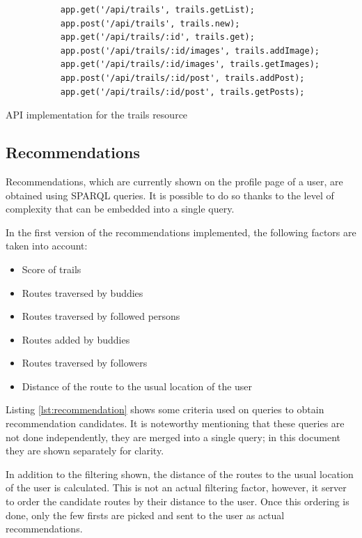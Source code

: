 \begin{listing}[ht]\centering
  \begin{minipage}{.7\textwidth}
    \begin{verbatim}
           app.get('/api/trails', trails.getList);
           app.post('/api/trails', trails.new);
           app.get('/api/trails/:id', trails.get);
           app.post('/api/trails/:id/images', trails.addImage);
           app.get('/api/trails/:id/images', trails.getImages);
           app.post('/api/trails/:id/post', trails.addPost);
           app.get('/api/trails/:id/post', trails.getPosts);
    \end{verbatim}
  \end{minipage}
  \caption{API implementation for the trails resource}\label{lst:routes}
\end{listing}

\subsection{Recommendations}

Recommendations, which are currently shown on the profile page of a user, are obtained using SPARQL queries. It is possible to do so thanks to the level of complexity that can be embedded into a single query.

In the first version of the recommendations implemented, the following factors are taken into account:

\begin{itemize}
\item Score of trails
\item Routes traversed by buddies
\item Routes traversed by followed persons
\item Routes added by buddies
\item Routes traversed by followers
\item Distance of the route to the usual location of the user
\end{itemize} 

Listing \ref{lst:recommendation} shows some criteria used on queries to obtain recommendation candidates. It is noteworthy mentioning that these queries are not done independently, they are merged into a single query; in this document they are shown separately for clarity. 

In addition to the filtering shown, the distance of the routes to the usual location of the user is calculated. This is not an actual filtering factor, however, it server to order the candidate routes by their distance to the user. Once this ordering is done, only the few firsts are picked and sent to the user as actual recommendations. 

